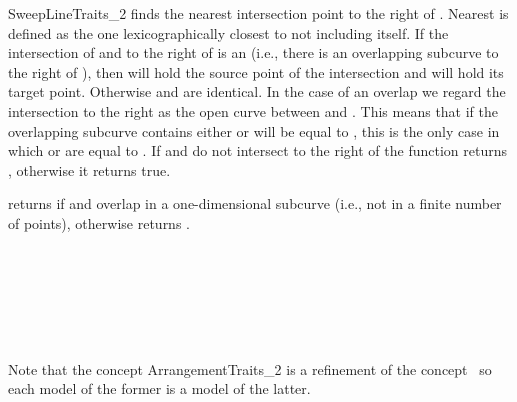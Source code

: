 \begin{ccRefConcept}{SweepLineTraits_2}
{finds the
nearest intersection point to the right of . Nearest is defined as the
one lexicographically closest to  not including  itself.
If the intersection of  and  to the
right of  is an  (i.e., there is an overlapping subcurve
to the right of ),
then  will hold the source point of the intersection and
 will hold its target point. Otherwise  and  are
identical. In the case of an overlap we regard the intersection
to the right as the open curve between  and . This means that
if the overlapping subcurve contains  either  or  will
be equal to , this is the only case in which  or  are
 equal to .
If  and  do not intersect to the right of 
the function returns , otherwise it returns true.
}


{returns  if  and  overlap
in a one-dimensional subcurve (i.e., not in a finite number
of points), otherwise returns
.}

\ccHasModels
  \\
  \\
  \\
   \\
   \\

  Note that the concept ArrangementTraits\_2 is a refinement of the 
  concept \ccRefName\ so each model of the former is a model of the latter.

\ccSeeAlso







\end{ccRefConcept}


